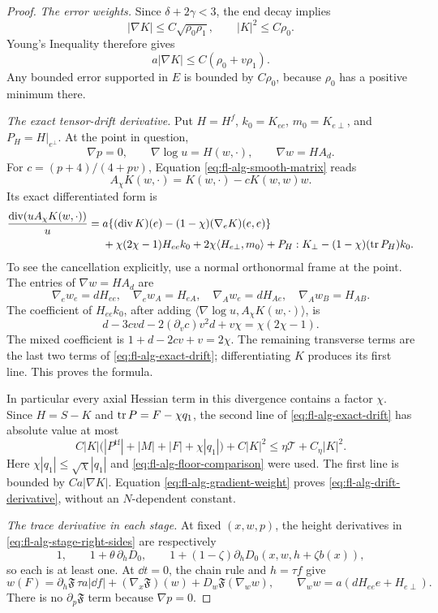 \begin{proof}
\emph{The error weights.}
Since \(\delta+2\gamma<3\), the end decay implies
\[
 |\nabla K|\le C\sqrt{\rho_0\rho_1},\qquad
 |K|^2\le C\rho_0.
\]
Young's Inequality therefore gives
\begin{equation}
 a|\nabla K|\le C(\rho_0+v\rho_1).
 \label{eq:fl-alg-gradient-weight}
\end{equation}
Any bounded error supported in \(E\) is bounded by \(C\rho_0\),
because \(\rho_0\) has a positive minimum there.

\emph{The exact tensor-drift derivative.}
Put \(H=H^f\), \(k_0=K_{ee}\), \(m_0=K_{e\perp}\), and
\(P_H=H|_{e^\perp}\). At the point in question,
\[
 \nabla p=0,\qquad \nabla\log u=H(w,\cdot),
 \qquad \nabla w=H A_d.
\]
For \(c=(p+4)/(4+pv)\), Equation
\eqref{eq:fl-alg-smooth-matrix} reads
\[
 A_\chi K(w,\cdot)=K(w,\cdot)-cK(w,w)w.
\]
Its exact differentiated form is
\begin{align}
 \frac{\operatorname{div}(uA_\chi K(w,\cdot))}{u}
 ={}&a\{(\operatorname{div}K)(e)
                     -(1-\chi)(\nabla_eK)(e,e)\}\notag\\
 &+\chi(2\chi-1)H_{ee}k_0
      +2\chi\langle H_{e\perp},m_0\rangle
      +P_H:K_\perp-(1-\chi)(\operatorname{tr} P_H)k_0.
 \label{eq:fl-alg-exact-drift}
\end{align}
To see the cancellation explicitly, use a normal orthonormal frame
at the point. The entries of \(\nabla w=H A_d\) are
\[
 \nabla_e w_e=dH_{ee},\quad
 \nabla_e w_A=H_{eA},\quad
 \nabla_A w_e=dH_{Ae},\quad
 \nabla_A w_B=H_{AB}.
\]
The coefficient of \(H_{ee}k_0\), after adding
\(\langle\nabla\log u,A_\chi K(w,\cdot)\rangle\), is
\[
 d-3cvd-2(\partial_vc)v^2d+v\chi
 =\chi(2\chi-1).
\]
The mixed coefficient is \(1+d-2cv+v=2\chi\).
The remaining transverse terms are the last two terms of
\eqref{eq:fl-alg-exact-drift}; differentiating \(K\) produces its
first line. This proves the formula.

In particular every axial Hessian term in this divergence contains a
factor \(\chi\). Since \(H=S-K\) and
\(\operatorname{tr} P=F-\chi q_1\), the second line of
\eqref{eq:fl-alg-exact-drift} has absolute value at most
\[
 C|K|\bigl(|P^{\mathrm{tf}}|+|M|+|F|+\chi|q_1|\bigr)+C|K|^2
 \le\eta\mathcal T+C_\eta|K|^2.
\]
Here \(\chi|q_1|\le\sqrt{\chi}|q_1|\) and
\eqref{eq:fl-alg-floor-comparison} were used.
The first line is bounded by \(Ca|\nabla K|\).
Equation \eqref{eq:fl-alg-gradient-weight} proves
\eqref{eq:fl-alg-drift-derivative}, without an \(N\)-dependent constant.

\emph{The trace derivative in each stage.}
At fixed \((x,w,p)\), the height derivatives in
\eqref{eq:fl-alg-stage-right-sides} are respectively
\[
 1,\qquad 1+\theta\,\partial_hD_0,\qquad
 1+(1-\zeta)\partial_hD_0(x,w,h+\zeta b(x)),
\]
so each is at least one.
At \(\dd t=0\), the chain rule and \(h=\tau f\) give
\begin{equation}
 w(F)
 =\partial_h\mathfrak F\,\tau a|\dd f|
       +(\nabla_x\mathfrak F)(w)
       +D_w\mathfrak F(\nabla_w w),
 \qquad
 \nabla_w w=a(dH_{ee}e+H_{e\perp}).
 \label{eq:fl-alg-trace-chain}
\end{equation}
There is no \(\partial_p\mathfrak F\) term because \(\nabla p=0\).


\end{proof}
